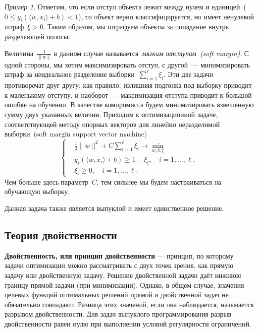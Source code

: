 \documentclass[a4paper, 12pt]{article}
\renewcommand{\geq}{\geqslant}
\renewcommand{\leq}{\leqslant}
\theoremstyle{plain} %
\theoremstyle{definition} %
\theoremstyle{remark} %
\newtheorem{example}{Пример}
\begin{document}
\begin{example}
Отметим, что если отступ объекта лежит между нулем и
единицей~($0 \leq y_i \left( \langle w, x_i \rangle + b \right) < 1$),
то объект верно классифицируется, но имеет ненулевой штраф~$\xi > 0$.
Таким образом, мы штрафуем объекты за попадание внутрь разделяющей полосы.

Величина~$\frac{1}{\|w\|}$ в данном случае называется~\emph{мягким отступом~(soft margin)}.
С одной стороны, мы хотим максимизировать отступ, с другой~--- минимизировать
штраф за неидеальное разделение выборки~$\sum_{i = 1}^{\ell} \xi_i$.
Эти две задачи противоречат друг другу: как правило, излишняя подгонка под
выборку приводит к маленькому отступу, и наоборот~--- максимизация отступа
приводит к большой ошибке на обучении.
В качестве компромисса будем минимизировать взвешенную сумму двух указанных величин.
Приходим к оптимизационной задаче,
соответствующей методу опорных векторов для линейно неразделимой выборки~(soft margin support vector machine)
\begin{equation}
\label{eq:svmUnsep}
    \left\{
        \begin{aligned}
            & \frac{1}{2} \|w\|^2 + C \sum_{i = 1}^{\ell} \xi_i \to \min_{w, b, \xi} \\
            & y_i \left(
                \langle w, x_i \rangle + b
            \right) \geq 1 - \xi_i, \quad i = 1, \dots, \ell, \\
            & \xi_i \geq 0, \quad i = 1, \dots, \ell.
        \end{aligned}
    \right.
\end{equation}
Чем больше здесь параметр~$C$, тем сильнее мы будем настраиваться на обучающую выборку.

Данная задача также является выпуклой и имеет единственное решение.

\subsection{Теория двойственности}

\textbf{Двойственность, или принцип двойственности} — принцип, по которому задачи оптимизации можно рассматривать с двух точек зрения, как прямую задачу или двойственную задачу. Решение двойственной задачи даёт нижнюю границу прямой задачи (при минимизации). Однако, в общем случае, значения целевых функций оптимальных решений прямой и двойственной задач не обязательно совпадают. Разница этих значений, если она наблюдается, называется разрывом двойственности. Для задач выпуклого программирования разрыв двойственности равен нулю при выполнении условий регулярности ограничений.


\end{example}
\end{document}
